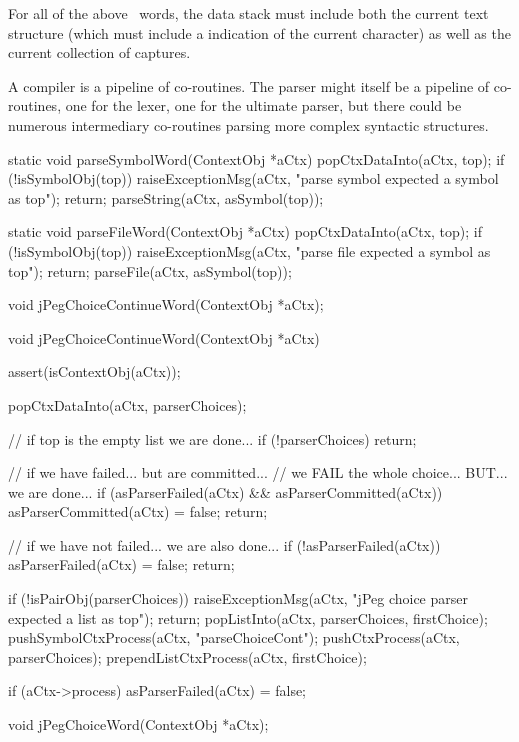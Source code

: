 For all of the above \joylol\ words, the data stack must include both the 
current text structure (which must include a indication of the current 
character) as well as the current collection of captures. 

A compiler is a pipeline of co-routines. The parser might itself be a 
pipeline of co-routines, one for the lexer, one for the ultimate parser, 
but there could be numerous intermediary co-routines parsing more complex 
syntactic structures. 

\startCCode
static void parseSymbolWord(ContextObj *aCtx) {
  popCtxDataInto(aCtx, top);
  if (!isSymbolObj(top)) {
    raiseExceptionMsg(aCtx,
      "parse symbol expected a symbol as top");
    return;
  }
  parseString(aCtx, asSymbol(top));
}

static void parseFileWord(ContextObj *aCtx) {
  popCtxDataInto(aCtx, top);
  if (!isSymbolObj(top)) {
    raiseExceptionMsg(aCtx,
      "parse file expected a symbol as top");
    return;
  }
  parseFile(aCtx, asSymbol(top));
}
\stopCCode



\startCHeader
void jPegChoiceContinueWord(ContextObj *aCtx);
\stopCHeader

\startCCode
void jPegChoiceContinueWord(ContextObj *aCtx) {
  assert(isContextObj(aCtx));
  
  popCtxDataInto(aCtx, parserChoices);
  
  // if top is the empty list we are done...
  if (!parserChoices) return;

  // if we have failed... but are committed... 
  // we FAIL the whole choice... BUT... we are done...
  if (asParserFailed(aCtx) && asParserCommitted(aCtx)) {
    asParserCommitted(aCtx) = false;
    return;
  }
  
  // if we have not failed... we are also done...
  if (!asParserFailed(aCtx)) {
    asParserFailed(aCtx) = false;
    return;
  }
  
  if (!isPairObj(parserChoices)) {
    raiseExceptionMsg(aCtx,
      "jPeg choice parser expected a list as top");
    return;
  }
  popListInto(aCtx, parserChoices, firstChoice);
  pushSymbolCtxProcess(aCtx, "parseChoiceCont");
  pushCtxProcess(aCtx, parserChoices);
  prependListCtxProcess(aCtx, firstChoice);
  
  if (aCtx->process) {
    asParserFailed(aCtx) = false;
  }

}
\stopCCode

\startCHeader
void jPegChoiceWord(ContextObj *aCtx);
\stopCHeader

